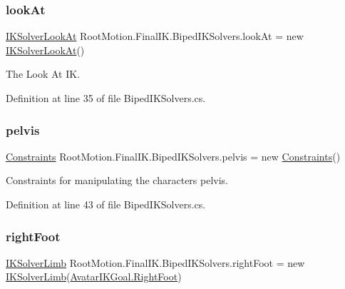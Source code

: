 \subsubsection{\texorpdfstring{look\+At}{lookAt}}
{\footnotesize\ttfamily \mbox{\hyperlink{class_root_motion_1_1_final_i_k_1_1_i_k_solver_look_at}{I\+K\+Solver\+Look\+At}} Root\+Motion.\+Final\+I\+K.\+Biped\+I\+K\+Solvers.\+look\+At = new \mbox{\hyperlink{class_root_motion_1_1_final_i_k_1_1_i_k_solver_look_at}{I\+K\+Solver\+Look\+At}}()}



The Look At IK. 



Definition at line 35 of file Biped\+I\+K\+Solvers.\+cs.

\mbox{\label{class_root_motion_1_1_final_i_k_1_1_biped_i_k_solvers_a1a35e0f2ddbb2dca73da4e6d22fa1025}} 
\subsubsection{\texorpdfstring{pelvis}{pelvis}}
{\footnotesize\ttfamily \mbox{\hyperlink{class_root_motion_1_1_final_i_k_1_1_constraints}{Constraints}} Root\+Motion.\+Final\+I\+K.\+Biped\+I\+K\+Solvers.\+pelvis = new \mbox{\hyperlink{class_root_motion_1_1_final_i_k_1_1_constraints}{Constraints}}()}



Constraints for manipulating the character\textquotesingle{}s pelvis. 



Definition at line 43 of file Biped\+I\+K\+Solvers.\+cs.

\mbox{\label{class_root_motion_1_1_final_i_k_1_1_biped_i_k_solvers_a0d2177edd1129de6be2b44c965337b1e}} 
\subsubsection{\texorpdfstring{right\+Foot}{rightFoot}}
{\footnotesize\ttfamily \mbox{\hyperlink{class_root_motion_1_1_final_i_k_1_1_i_k_solver_limb}{I\+K\+Solver\+Limb}} Root\+Motion.\+Final\+I\+K.\+Biped\+I\+K\+Solvers.\+right\+Foot = new \mbox{\hyperlink{class_root_motion_1_1_final_i_k_1_1_i_k_solver_limb}{I\+K\+Solver\+Limb}}(\mbox{\hyperlink{namespace_root_motion_1_1_final_i_k_ae0dd2058c7667b6f132c11a6b860c14aac901c64cc70540fbd6d7f6c71b047a6a}{Avatar\+I\+K\+Goal.\+Right\+Foot}})}



